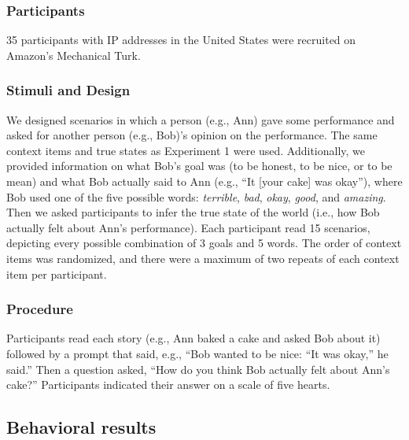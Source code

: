 \documentclass[10pt,letterpaper]{article}
\begin{document}
\subsubsection{Participants}

35 participants with IP addresses in the United States were recruited on Amazon's Mechanical Turk.


\subsubsection{Stimuli and Design}

We designed scenarios in which a person (e.g., Ann) gave some performance and asked for another person (e.g., Bob)'s opinion on the performance. The same context items and true states as Experiment 1 were used. Additionally, we provided information on what Bob's goal was (to be honest, to be nice, or to be mean) and what Bob actually said to Ann (e.g., ``It [your cake] was okay''), where Bob used one of the five possible words: \emph{terrible}, \emph{bad}, \emph{okay}, \emph{good}, and \emph{amazing}. Then we asked participants to infer the true state of the world (i.e., how Bob actually felt about Ann's performance). Each participant read 15 scenarios, depicting every possible combination of 3 goals and 5 words. The order of context items was randomized, and there were a maximum of two repeats of each context item per participant.

\subsubsection{Procedure}
Participants read each story (e.g., Ann baked a cake and asked Bob about it) followed by a prompt that said,
e.g., ``Bob wanted to be nice: ``It was okay,'' he said.''
Then a question asked, ``How do you think Bob actually felt about Ann's cake?''
Participants indicated their answer on a scale of five hearts.

\subsection{Behavioral results}

\end{document}
